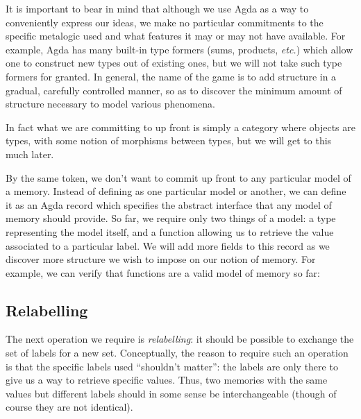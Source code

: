 \documentclass{jfp}
\begin{document}
It is important to bear in mind that although we use Agda as a way to
conveniently express our ideas, we make no particular commitments to
the specific metalogic used and what features it may or may not have
available.  For example, Agda has many built-in type formers (sums,
products, \emph{etc.}) which allow one to construct new types out of
existing ones, but we will not take such type formers for granted.  In
general, the name of the game is to add structure in a gradual,
carefully controlled manner, so as to discover the minimum amount of
structure necessary to model various phenomena.

\begin{commentary}
  In fact what we are committing to up front is simply a category
  where objects are types, with some notion of morphisms between
  types, but we will get to this much later.
\end{commentary}

By the same token, we don't want to commit up front to any particular
model of a memory.  Instead of defining  as one
particular model or another, we can define it as an Agda record which
specifies the abstract interface that any model of memory should
provide.  So far, we require only two things of a model: a type
 representing the model itself, and a function
 allowing us to retrieve the value associated to a
particular label.  We will add more fields to this record as we
discover more structure we wish to impose on our notion of memory.
%
%
For example, we can verify that functions are a valid model of memory
so far:
%

\subsection{Relabelling}
\label{sec:relabelling}

The next operation we require is \emph{relabelling}: it should be
possible to exchange the set of labels for a new set.  Conceptually,
the reason to require such an operation is that the specific labels
used ``shouldn't matter'': the labels are only there to give us a way
to retrieve specific values.  Thus, two memories with the same values
but different labels should in some sense be interchangeable (though
of course they are not identical).
\end{document}
